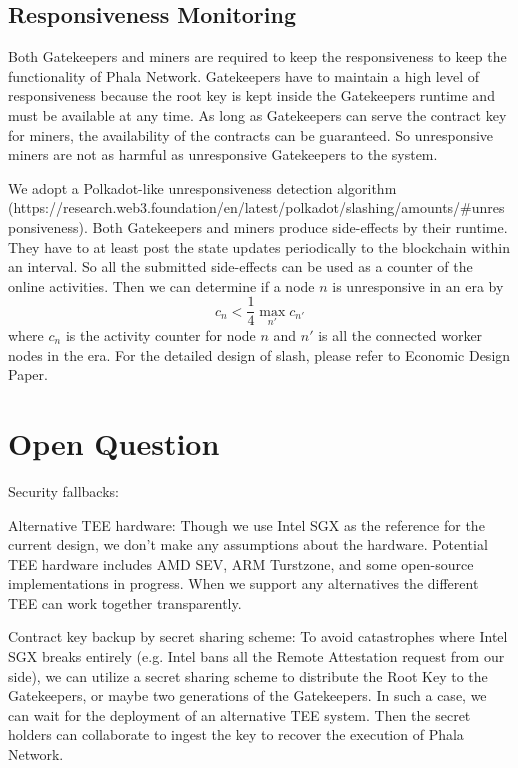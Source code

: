 \subsection{Responsiveness Monitoring}

Both Gatekeepers and miners are required to keep the responsiveness to keep the functionality of Phala Network. Gatekeepers have to maintain a high level of responsiveness because the root key is kept inside the Gatekeepers runtime and must be available at any time. As long as Gatekeepers can serve the contract key for miners, the availability of the contracts can be guaranteed. So unresponsive miners are not as harmful as unresponsive Gatekeepers to the system.

We adopt a Polkadot-like unresponsiveness detection algorithm (https://research.web3.foundation/en/latest/polkadot/slashing/amounts/#unresponsiveness). Both Gatekeepers and miners produce side-effects by their runtime. They have to at least post the state updates periodically to the blockchain within an interval. So all the submitted side-effects can be used as a counter of the online activities. Then we can determine if a node $n$ is unresponsive in an era by
$$
    c_n < \frac{1}{4} \max\limits_{n'}{c_{n'}}
$$
where $c_n$ is the activity counter for node $n$ and $n'$ is all the connected worker nodes in the era. For the detailed design of slash, please refer to Economic Design Paper.


\section{Open Question}

Security fallbacks:

\begin{icompact}
    \item Alternative TEE hardware: Though we use Intel SGX as the reference for the current design, we don't make any assumptions about the hardware. Potential TEE hardware includes AMD SEV, ARM Turstzone, and some open-source implementations in progress. When we support any alternatives the different TEE can work together transparently.
    \item Contract key backup by secret sharing scheme: To avoid catastrophes where Intel SGX breaks entirely (e.g. Intel bans all the Remote Attestation request from our side), we can utilize a secret sharing scheme to distribute the Root Key to the Gatekeepers, or maybe two generations of the Gatekeepers. In such a case, we can wait for the deployment of an alternative TEE system. Then the secret holders can collaborate to ingest the key to recover the execution of Phala Network.
\end{icompact}

